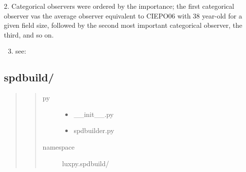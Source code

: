 \documentclass[letterpaper,10pt,english]{sphinxmanual}
\begin{document}
\begin{fulllineitems}
\begin{description}
2. Categorical observers were ordered by the importance; 
the first categorical observer vas the average observer equivalent to 
CIEPO06 with 38 year-old for a given field size, followed by the second
most important categorical observer, the third, and so on.
\begin{enumerate}
\setcounter{enumi}{2}
\item {} 
see: 

\end{enumerate}

\end{description}

\end{fulllineitems}



\subsection{spdbuild/}
\label{\detokenize{toolboxes:spdbuild}}\begin{quote}
\begin{quote}\begin{description}
\item[{py}] \leavevmode\begin{itemize}
\item {} 
\_\_init\_\_.py

\item {} 
spdbuilder.py

\end{itemize}

\item[{namespace}] \leavevmode
luxpy.spdbuild/

\end{description}\end{quote}
\end{quote}
\label{\detokenize{toolboxes:module-luxpy.toolboxes.spdbuild}}
\end{document}
